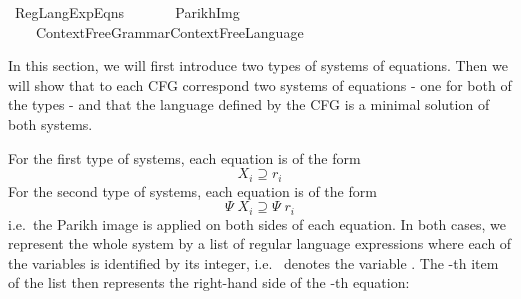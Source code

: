 %
\begin{isabellebody}%
%
%
\isadelimdocument
%
\endisadelimdocument
%
\isatagdocument
%
\isamarkuptrue%
%
\endisatagdocument
{\isafolddocument}%
%
\isadelimdocument
%
\endisadelimdocument
%
\isadelimtheory
%
\endisadelimtheory
%
\isatagtheory
{}\isamarkupfalse%
\ Reg{\isacharunderscore}{\kern0pt}Lang{\isacharunderscore}{\kern0pt}Exp{\isacharunderscore}{\kern0pt}Eqns\isanewline
\ \ \isanewline
\ \ \ \ {\isachardoublequoteopen}Parikh{\isacharunderscore}{\kern0pt}Img{\isachardoublequoteclose}\isanewline
\ \ \ \ {\isachardoublequoteopen}Context{\isacharunderscore}{\kern0pt}Free{\isacharunderscore}{\kern0pt}Grammar{\isachardot}{\kern0pt}Context{\isacharunderscore}{\kern0pt}Free{\isacharunderscore}{\kern0pt}Language{\isachardoublequoteclose}\isanewline
{}%
\endisatagtheory
{\isafoldtheory}%
%
\isadelimtheory
%
\endisadelimtheory
%
\begin{isamarkuptext}%
In this section, we will first introduce two types of systems of
equations. Then we will show that to each CFG correspond two systems of equations - one for both
of the types - and that the language defined by the CFG is a minimal solution of both systems.%
\end{isamarkuptext}\isamarkuptrue%
%
\isadelimdocument
%
\endisadelimdocument
%
\isatagdocument
%
\isamarkuptrue%
%
\endisatagdocument
{\isafolddocument}%
%
\isadelimdocument
%
\endisadelimdocument
%
\begin{isamarkuptext}%
For the first type of systems, each equation is of the form
\[X_i \supseteq r_i\]
For the second type of systems, each equation is of the form
\[\Psi \; X_i \supseteq \Psi \; r_i\]
i.e.\ the Parikh image is applied on both sides of each equation.
In both cases, we represent the whole system by a list of regular language expressions where each
of the variables  is identified by its integer, i.e.\  denotes the variable
. The -th item of the list then represents the right-hand side  of the -th equation:%
\end{isamarkuptext}\isamarkuptrue%

\end{isabellebody}
